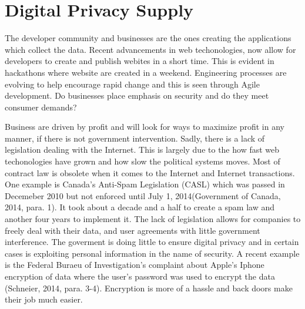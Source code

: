\documentclass[12pt]{article}
\begin{document}
\section{Digital Privacy Supply}\label{sec:supply}

The developer community and businesses are the ones creating the applications which collect the data. Recent advancements in web techonologies, now allow for developers to create and publish webites in a short time. This is evident in hackathons where website are created in a weekend. Engineering processes are evolving to help encourage rapid change and this is seen through Agile development. Do businesses place emphasis on security and do they meet consumer demands?

Business are driven by profit and will look for ways to maximize profit in any manner, if there is not government intervention. Sadly, there is a lack of legislation dealing with the Internet. This is largely due to the how fast web techonologies have grown and how slow the political systems moves. Most of contract law is obsolete when it comes to the Internet and Internet transactions. One example is Canada's Anti-Spam Legislation (CASL) which was passed in Decemeber 2010 but not enforced until July 1, 2014(Government of Canada, 2014, para. 1). It took about a decade and a half to create a spam law and another four years to implement it. The lack of legislation allows for companies to freely deal with their data, and user agreements with little government interference. The goverment is doing little to ensure digital privacy and in certain cases is exploiting personal information in the name of security. A recent example is the Federal Buraeu of Investigation's complaint about Apple's Iphone encryption of data where the user's password was used to encrypt the data (Schneier, 2014, para. 3-4). Encryption is more of a hassle and back doors make their job much easier.
\end{document}
